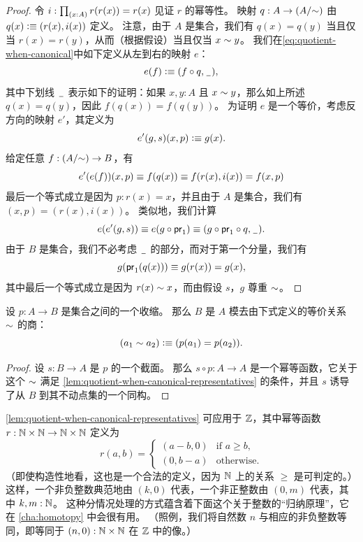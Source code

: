 \begin{proof}
  令 $i : \prd{x : A} r(r(x)) = r(x)$ 见证 $r$ 的幂等性。
  映射 $q : A \to (A/{\sim})$ 由 $q(x) \vcentcolon\equiv (r(x), i(x))$ 定义。
  注意，由于 $A$ 是集合，我们有 $q(x)=q(y)$ 当且仅当 $r(x)=r(y)$，从而（根据假设）当且仅当 $x \sim y$。
  我们在\eqref{eq:quotient-when-canonical}中如下定义从左到右的映射 $e$：
  \[ e(f) \vcentcolon\equiv (f \circ q, \mathord{\hspace{1pt}\underline{\hspace{1ex}}\hspace{1pt}}), \]
  其中下划线 $\mathord{\hspace{1pt}\underline{\hspace{1ex}}\hspace{1pt}}$ 表示如下的证明：如果 $x, y : A$ 且 $x \sim y$，那么如上所述 $q(x)=q(y)$，因此 $f(q(x)) = f(q(y))$。
  为证明 $e$ 是一个等价，考虑反方向的映射 $e'$，其定义为
  \[ e'(g, s) (x,p) \vcentcolon\equiv g(x). \]
  给定任意 $f : (A/{\sim}) \to B$，有
  \[ e'(e(f))(x, p) \equiv f(q(x)) \equiv f(r(x), i(x)) = f(x, p) \]
  最后一个等式成立是因为 $p : r(x) = x$，并且由于 $A$ 是集合，我们有 $(x,p) = (r(x), i(x))$。
  类似地，我们计算
  \[ e(e'(g, s)) \equiv e(g \circ \mathsf{pr}_{1}) \equiv (g \circ \mathsf{pr}_{1} \circ q, {\mathord{\hspace{1pt}\underline{\hspace{1ex}}\hspace{1pt}}}). \]
  由于 $B$ 是集合，我们不必考虑 $\mathord{\hspace{1pt}\underline{\hspace{1ex}}\hspace{1pt}}$ 的部分，而对于第一个分量，我们有
  \[ g(\mathsf{pr}_{1}(q(x))) \equiv g(r(x)) = g(x), \]
  其中最后一个等式成立是因为 $r(x) \sim x$，而由假设 $s$，$g$ 尊重 $\sim$。
\end{proof}

\begin{cor}\label{thm:retraction-quotient}
  设 $p:A\to B$ 是集合之间的一个收缩。
  那么 $B$ 是 $A$ 模去由下式定义的等价关系 $\sim$ 的商：
  \[ (a_1 \sim a_2) \vcentcolon\equiv (p(a_1) = p(a_2)). \]
\end{cor}

\begin{proof}
  设 $s:B\to A$ 是 $p$ 的一个截面。
  那么 $s\circ p : A\to A$ 是一个幂等函数，它关于这个 $\sim$ 满足 \cref{lem:quotient-when-canonical-representatives} 的条件，并且 $s$ 诱导了从 $B$ 到其不动点集的一个同构。
\end{proof}

\begin{rmk}\label{Z-quotient-by-canonical-representatives}
\cref{lem:quotient-when-canonical-representatives} 可应用于 $\mathbb{Z}$，其中幂等函数 $r : \mathbb{N} \times \mathbb{N} \to \mathbb{N} \times \mathbb{N}$ 定义为
%
\begin{equation*}
  r(a, b) =
  \begin{cases}
    (a - b, 0) & \text{if $a \geq b$,} \\
    (0, b - a) & \text{otherwise.}
  \end{cases}
\end{equation*}
%
（即使构造性地看，这也是一个合法的定义，因为 $\mathbb{N}$ 上的关系 $\geq$ 是可判定的。）
这样，一个非负整数典范地由 $(k, 0)$ 代表，一个非正整数由 $(0, m)$ 代表，其中 $k,m:\mathbb{N}$。
这种分情况处理的方式蕴含着下面这个关于整数的``归纳原理''，它在 \cref{cha:homotopy} 中会很有用。
%
（照例，我们将自然数 $n$ 与相应的非负整数等同，即等同于 $(n,0):\mathbb{N}\times\mathbb{N}$ 在 $\mathbb{Z}$ 中的像。）
\end{rmk}

